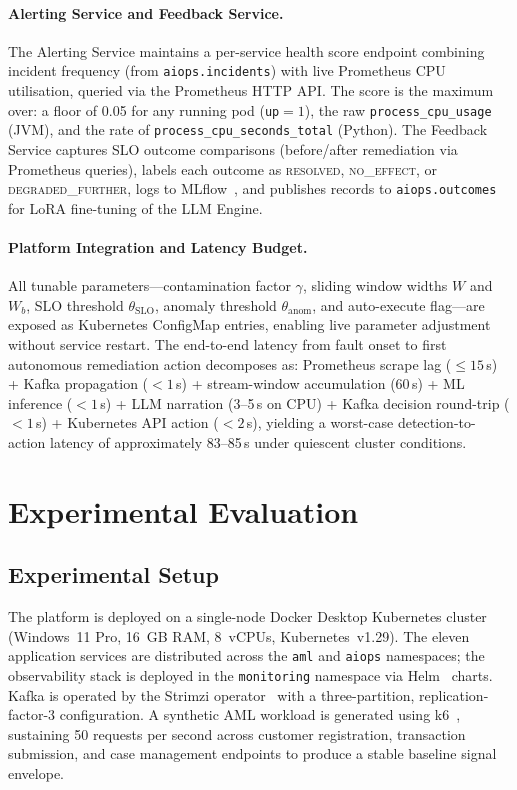 \documentclass[a4paper,anonymous,UKenglish]{lipics-v2021}
\begin{document}
\paragraph*{Alerting Service and Feedback Service.}
The Alerting Service maintains a per-service health score endpoint combining
incident frequency (from \texttt{aiops.incidents}) with live Prometheus CPU
utilisation, queried via the Prometheus HTTP API. The score is the maximum
over: a floor of 0.05 for any running pod (\texttt{up}$=1$), the raw
\texttt{process\_cpu\_usage} (JVM), and the rate of
\texttt{process\_cpu\_seconds\_total} (Python). The Feedback Service captures
SLO outcome comparisons (before/after remediation via Prometheus queries),
labels each outcome as \textsc{resolved}, \textsc{no\_effect}, or
\textsc{degraded\_further}, logs to MLflow~\cite{mlflow2018}, and publishes
records to \texttt{aiops.outcomes} for LoRA fine-tuning of the LLM Engine.

\paragraph*{Platform Integration and Latency Budget.}
All tunable parameters---contamination factor $\gamma$, sliding window widths
$W$ and $W_b$, SLO threshold $\theta_{\text{SLO}}$, anomaly threshold
$\theta_{\text{anom}}$, and auto-execute flag---are exposed as Kubernetes
ConfigMap entries, enabling live parameter adjustment without service restart.
The end-to-end latency from fault onset to first autonomous remediation action
decomposes as: Prometheus scrape lag ($\leq 15$\,s) + Kafka propagation
($< 1$\,s) + stream-window accumulation (60\,s) + ML inference ($< 1$\,s)
+ LLM narration (3--5\,s on CPU) + Kafka decision round-trip ($< 1$\,s)
+ Kubernetes API action ($< 2$\,s), yielding a worst-case
detection-to-action latency of approximately 83--85\,s under quiescent cluster
conditions.

\section{Experimental Evaluation}
\label{sec:eval}

\subsection{Experimental Setup}

The platform is deployed on a single-node Docker Desktop Kubernetes cluster
(Windows~11 Pro, 16~GB RAM, 8~vCPUs, Kubernetes~v1.29). The eleven application
services are distributed across the \texttt{aml} and \texttt{aiops} namespaces;
the observability stack is deployed in the \texttt{monitoring} namespace via
Helm~\cite{helm2016} charts. Kafka is operated by the Strimzi
operator~\cite{strimzi2019} with a three-partition, replication-factor-3
configuration. A synthetic AML workload is generated using k6~\cite{k62017},
sustaining 50 requests per second across customer registration, transaction
submission, and case management endpoints to produce a stable baseline signal
envelope.
\end{document}
